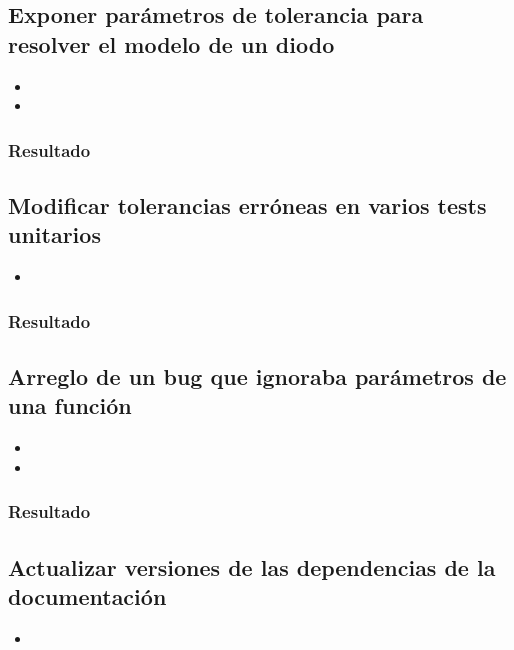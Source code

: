 \subsection{Exponer parámetros de tolerancia para resolver el modelo de un diodo}

\begin{itemize}
    \item {}
    \item {}
\end{itemize}

\subsubsection{Resultado}

\subsection{Modificar tolerancias erróneas en varios tests unitarios}

\begin{itemize}
    \item {}
\end{itemize}

\subsubsection{Resultado}

\subsection{Arreglo de un bug que ignoraba parámetros de una función}

\begin{itemize}
    \item {}
    \item {}
\end{itemize}
\subsubsection{Resultado}

\subsection{Actualizar versiones de las dependencias de la documentación}

\begin{itemize}
    \item {}
\end{itemize}

